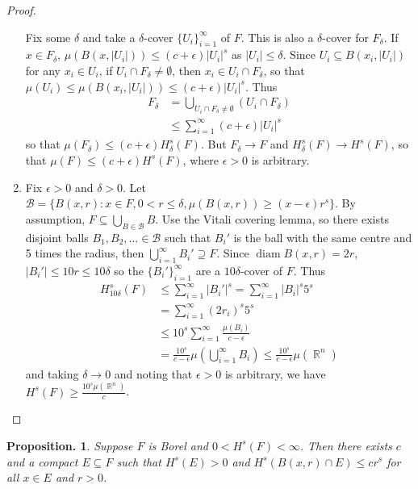 \documentclass[11pt, a4paper]{memoir}
\DeclareMathOperator{\R}{{\mathbb{R}}}
\theoremstyle{change}
\newtheorem{proposition}[theorem]{Proposition.}
\theoremstyle{plain}
\theoremstyle{nonumberplain}
\newtheorem{proof}{Proof}
\DeclareMathOperator{\diam}{diam}
\numberwithin{equation}{section}
\begin{document}
\begin{proof}
\begin{enumerate}[nl,r]
            Fix some $\delta$ and take a $\delta$-cover $\{U_i\}_{i=1}^\infty$ of $F$.
            This is also a $\delta$-cover for $F_\delta$.
            If $x\in F_\delta$, $\mu(B(x,|U_i|))\leq(c+\epsilon)|U_i|^s$ as $|U_i|\leq\delta$.
            Since $U_i\subseteq B(x_i,|U_i|)$ for any $x_i\in U_i$, if $U_i\cap F_\delta\neq\emptyset$, then $x_i\in U_i\cap F_\delta$, so that $\mu(U_i)\leq\mu(B(x_i,|U_i|))\leq(c+\epsilon)|U_i|^s$.
            Thus
            \begin{align*}
                F_\delta&=\bigcup_{U_i\cap F_\delta\neq\emptyset}(U_i\cap F_\delta)\\
                        &\leq\sum_{i=1}^\infty(c+\epsilon)|U_i|^s
            \end{align*}
            so that $\mu(F_\delta)\leq (c+\epsilon)H^s_\delta(F)$.
            But $F_\delta\to F$ and $H^s_\delta(F)\to H^s(F)$, so that $\mu(F)\leq(c+\epsilon)H^s(F)$, where $\epsilon>0$ is arbitrary.
        \item Fix $\epsilon>0$ and $\delta>0$.
            Let $\mathcal{B}=\{B(x,r):x\in F,0<r\leq\delta,\mu(B(x,r))\geq(x-\epsilon)r^s\}$.
            By assumption, $F\subseteq\bigcup_{B\in\mathcal{B}}B$.
            Use the Vitali covering lemma, so there exists disjoint balls $B_1,B_2,\ldots\in\mathcal{B}$ such that $B_i'$ is the ball with the same centre and 5 times the radius, then $\bigcup_{i=1}^\infty B_i'\supseteq F$.
            Since $\diam B(x,r)=2r$, $|B_i'|\leq 10r\leq 10\delta$ so the $\{B_i'\}_{i=1}^\infty$ are a $10\delta$-cover of $F$.
            Thus
            \begin{align*}
                H_{10\delta}^s(F) &\leq\sum_{i=1}^\infty|B_i'|^s = \sum_{i=1}^\infty|B_i|^s5^s\\
                                  &= \sum_{i=1}^\infty(2r_i)^s5^s\\
                                  &\leq 10^s\sum_{i=1}^\infty\frac{\mu(B_i)}{c-\epsilon}\\
                                  &= \frac{10^s}{c-\epsilon}\mu\left(\bigcup_{i=1}^\infty B_i\right)\leq\frac{10^s}{c-\epsilon}\mu(\R^n)
            \end{align*}
            and taking $\delta\to 0$ and noting that $\epsilon>0$ is arbitrary, we have $H^s(F)\geq\frac{10^s\mu(\R^n)}{c}$.
    \end{enumerate}
\end{proof}
\begin{proposition}
    Suppose $F$ is Borel and $0<H^s(F)<\infty$.
    Then there exists $c$ and a compact $E\subseteq F$ such that $H^s(E)>0$ and $H^s(B(x,r)\cap E)\leq cr^s$ for all $x\in E$ and $r>0$.
\end{proposition}
\end{document}
